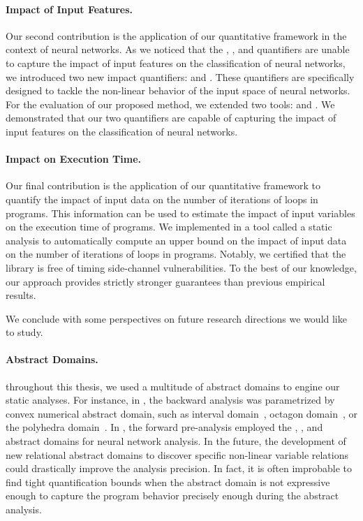 \paragraph{Impact of Input Features.} Our second contribution is the application of our quantitative framework in the context of neural networks.
As we noticed that the \outcomesname{}, \rangename{}, and \qusedname{} quantifiers are unable to capture the impact of input features on the classification of neural networks, we introduced two new impact quantifiers: \changesname{} and \qlibraname{}.
These quantifiers are specifically designed to tackle the non-linear behavior of the input space of neural networks.
For the evaluation of our proposed method, we extended two tools: \impatto{} and \libra{}.\sidenote{\libraurl}
We demonstrated that our two quantifiers are capable of capturing the impact of input features on the classification of neural networks.

\paragraph{Impact on Execution Time.} Our final contribution is the application of our quantitative framework to quantify the impact of input data on the number of iterations of loops in programs. This information can be used to estimate the impact of input variables on the execution time of programs.
We implemented in a tool called \timesec\sidenote{\timesecurl} a static analysis to automatically compute an upper bound on the impact of input data on the number of iterations of loops in programs.
Notably, we certified that the \bignum{} library\sidenote{\bignumurl} is free of timing side-channel vulnerabilities.
To the best of our knowledge, our approach provides strictly stronger guarantees than previous empirical results.


\frenchdiv

We conclude with some perspectives on future research directions we would like to study.

\paragraph{Abstract Domains.}

throughout this thesis, we used a multitude of abstract domains to engine our static analyses. For instance, in , the backward analysis was parametrized by convex numerical abstract domain, such as interval domain~, octagon domain~, or the polyhedra domain~\cite{Cousot1978}. In , the forward pre-analysis employed the \symbolic{} \cite{Wang2018b}, \deeppoly{} \cite{Singh2019}, and \neurify{} \cite{Wang2018a} abstract domains for neural network analysis. In the future, the development of new relational abstract domains to discover specific non-linear variable relations could drastically improve the analysis precision.
In fact, it is often improbable to find tight quantification bounds when the abstract domain is not expressive enough to capture the program behavior precisely enough during the abstract analysis.

